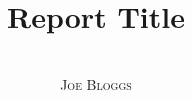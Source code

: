 \documentclass[12pt]{report}
\title{Report Title}
\author{\\ \textsc{Joe Bloggs}}
\date{}
\begin{document}
\maketitle




\tableofcontents
\listoffigures
\listoftables







\begin{appendices}
    
    
\end{appendices}
\end{document}
